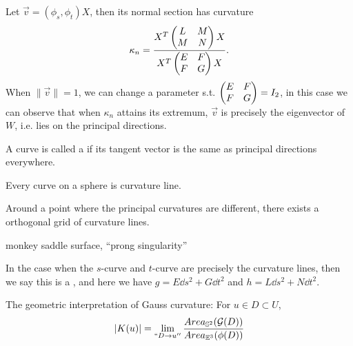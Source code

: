 Let $\vec{v}=(\phi_s,\phi_t)X$, then its normal section has curvature
\[
\kappa_n = \frac{X^T \begin{pmatrix} L&M\\M&N \end{pmatrix} X}{X^T \begin{pmatrix} E&F\\F&G \end{pmatrix} X}.
\]
When $ \lVert \vec{v} \rVert = 1$, we can change a parameter s.t.
$\begin{pmatrix} E&F\\F&G \end{pmatrix} = I_2$, in this case we can observe that
when $\kappa_n$ attains its extremum, $\vec{v}$ is precisely
the eigenvector of $W$, i.e. lies on the principal directions.

\begin{definition}
	A curve is called a  if its tangent vector
	is the same as principal directions everywhere.
\end{definition}
\begin{example}
    Every curve on a sphere is curvature line.

	Around a point where the principal curvatures are different,
	there exists a orthogonal grid of curvature lines.
\end{example}
\begin{example}
    monkey saddle surface, ``prong singularity''
\end{example}

In the case when the $s$-curve and  $t$-curve are precisely the
curvature lines, then we say this is a ,
and here we have $g = E\dd s^2 + G\dd t^2$ and $h = L\dd s^2 + N\dd t^2$.

\begin{remark}
    The geometric interpretation of Gauss curvature:
	For $u\in D \subset U$,
	\[
	|K(u)|=\lim_{``D\to u''}
	\frac{Area_{\mathbb{S}^2}(\mathcal{G}(D))}{Area_{\mathbb{E}^3}(\phi(D))}
	\]
\end{remark}
